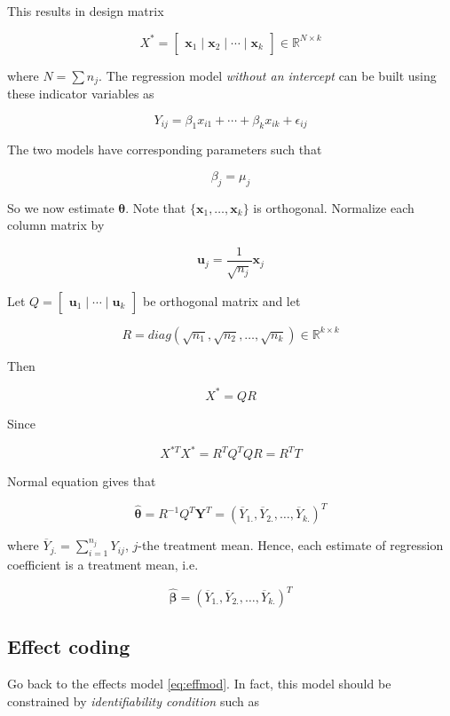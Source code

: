 \documentclass[]{book}
\theoremstyle{definition}
\theoremstyle{definition}
\theoremstyle{definition}
\theoremstyle{remark}
\begin{document}
This results in design matrix

\[
X^{\ast} = \begin{bmatrix}
  \mathbf{x}_1 \mid \mathbf{x}_2 \mid \cdots \mid \mathbf{x}_k
\end{bmatrix} \in \mathbb{R}^{N \times k}
\]

where \(N = \sum n_j\). The regression model \emph{without an intercept} can be built using these indicator variables as

\[Y_{ij} = \beta_1 x_{i1} + \cdots + \beta_k x_{ik} + \epsilon_{ij}\]

The two models have corresponding parameters such that

\[\beta_j = \mu_j\]

So we now estimate \(\boldsymbol\theta\). Note that \(\{ \mathbf{x}_1, \ldots, \mathbf{x}_k \}\) is orthogonal. Normalize each column matrix by

\[\mathbf{u}_j = \frac{1}{\sqrt{n_j}} \mathbf{x}_j\]

Let \(Q = \begin{bmatrix} \mathbf{u}_1 \mid \cdots \mid \mathbf{u}_k \end{bmatrix}\) be orthogonal matrix and let

\[R = diag(\sqrt{n_1}, \sqrt{n_2}, \ldots, \sqrt{n_k}) \in \mathbb{R}^{k \times k}\]

Then

\[X^{\ast} = QR\]

Since

\[X^{\ast T} X^{\ast} = R^TQ^TQR = R^TT\]

Normal equation gives that

\[\hat{\boldsymbol\theta} = R^{-1}Q^T\mathbf{Y}^T = (\overline{Y}_{1.}, \overline{Y}_{2.}, \ldots, \overline{Y}_{k.})^T\]

where \(\overline{Y}_{j.} = \sum\limits_{i = 1}^{n_j} Y_{ij}\), \(j\)-the treatment mean. Hence, each estimate of regression coefficient is a treatment mean, i.e.

\[\boldsymbol{\hat\beta}= (\overline{Y}_{1.}, \overline{Y}_{2.}, \ldots, \overline{Y}_{k.})^T\]

\hypertarget{effect-coding}{%
\subsection{Effect coding}\label{effect-coding}}

Go back to the effects model \eqref{eq:effmod}. In fact, this model should be constrained by \emph{identifiability condition} such as
\end{document}
